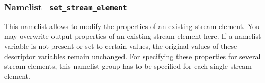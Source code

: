 \subsubsection{Namelist {\tt
    set\_stream\_element}} 

This namelist allows to modify the properties of an existing stream
element. You may overwrite output properties of an existing stream
element here. If a namelist
variable is not present or set to certain values, the original values
of these descriptor variables remain unchanged.
For specifying these properties for several stream
elements, this namelist group has to be specified for each single
stream element.

\setlength{\LTcapwidth}{\textwidth}
\setlength{\LTleft}{0pt}\setlength{\LTright}{0pt}


